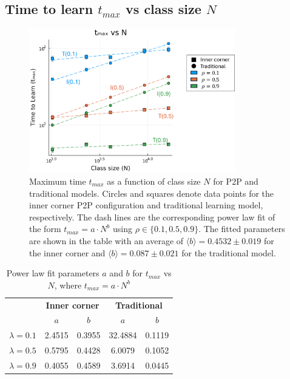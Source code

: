 \newpage

\subsection{Time to learn $t_{max}$ vs class size $N$} \label{subsec: 2DBPCA tmax vs N}
\begin{figure}[h!]
    \centering
    \includegraphics[width=0.8\textwidth]{figures/2D-BPCA-analysis/N_vs_tmax-traditional-inner_corner.png}
    \caption[Class size dependence of time to learn in homogenous models]{Maximum time $t_{max}$ as a function of class size $N$ for P2P and traditional models. Circles and squares denote data points for the inner corner P2P configuration and traditional learning model, respectively. The dash lines are the corresponding power law fit of the form $t_{max}=a \cdot N^b$ using $\rho \in \lbrace 0.1, 0.5, 0.9 \rbrace$. The fitted parameters are shown in the table with an average of $\langle b \rangle = 0.4532 \pm 0.019$ for the inner corner and $\langle b \rangle = 0.087\pm0.021$ for the traditional model.}
    \label{fig:Traditional vs PI tmax vs N}
\end{figure}

\begin{table}[htbp!]
  \centering
  
  \begin{tabular}{|c|cc|cc|}
    \hline
    & \multicolumn{2}{c|}{\textbf{Inner corner}}       & \multicolumn{2}{c|}{\textbf{Traditional}}        \\ \cline{2-5} 
    & \multicolumn{1}{c|}{\textbf{$a$}} & \textbf{$b$} & \multicolumn{1}{c|}{\textbf{$a$}} & \textbf{$b$} \\ \hline
    \textbf{$\lambda=0.1$} & \multicolumn{1}{c|}{2.4515}       & 0.3955       & \multicolumn{1}{c|}{32.4884}      & 0.1119       \\ \hline
    \textbf{$\lambda=0.5$} & \multicolumn{1}{c|}{0.5795}       & 0.4428       & \multicolumn{1}{c|}{6.0079}       & 0.1052       \\ \hline
    \textbf{$\lambda=0.9$} & \multicolumn{1}{c|}{0.4055}       & 0.4589       & \multicolumn{1}{c|}{3.6914}       & 0.0445       \\ \hline
  \end{tabular}
  \caption{Power law fit parameters $a$ and $b$ for $t_{max}$ vs $N$, where $t_{max}=a \cdot N ^ b$}
  \label{tab:2DBPCA tmax vs N fit params}
\end{table}

